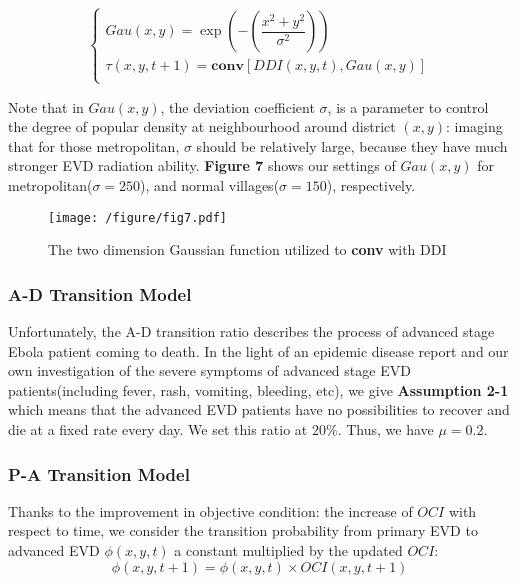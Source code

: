 \begin{equation}
 \left\{
\begin{aligned}
Gau\left( x,y\right) =\exp\left(-\left( \dfrac {x^{2}+y^{2}}{\sigma ^{2}}\right)\right)\\
\tau \left( x,y,t+1\right) =\textbf{conv}\left[ DDI\left( x,y,t\right) ,Gau\left( x,y\right) \right]\\
\end{aligned}
\right.
\end{equation}

Note that in $Gau(x,y)$, the deviation coefficient $\sigma$, is a parameter to control the degree of popular density at neighbourhood around district $(x,y)$: imaging that for those metropolitan, $\sigma$ should be relatively large, because they have much stronger EVD radiation ability. \textbf{Figure 7} shows our settings of $Gau(x,y)$ for metropolitan($\sigma=250$), and normal villages($\sigma=150$), respectively.

\begin{figure}[htbp]
\centering
\texttt{[image: /figure/fig7.pdf]}
\caption{The two dimension Gaussian function utilized to \textbf{conv} with DDI}\label{fig:7}
\end{figure}


\subsubsection{A-D Transition Model}
Unfortunately, the A-D transition ratio describes the process of advanced stage Ebola patient coming to death. In the light of an epidemic disease report \cite{dowell1999transmission} and our own investigation of the severe symptoms of advanced stage EVD patients(including fever, rash, vomiting, bleeding, etc), we give \textbf{Assumption 2-1} which means that the advanced EVD patients have no possibilities to recover and die at a fixed rate every day. We set this ratio at $20\%$. Thus, we have $\mu=0.2$.  

\subsubsection{P-A Transition Model}
Thanks to the improvement in objective condition: the increase of $OCI$ with respect to time, we consider the transition probability from primary EVD to advanced EVD $\phi(x,y,t)$ a constant multiplied by the updated $OCI$:
\begin{equation}
 \phi \left( x,y,t+1\right) =\phi \left( x,y,t\right) \times OCI(x,y,t+1)
\end{equation}

